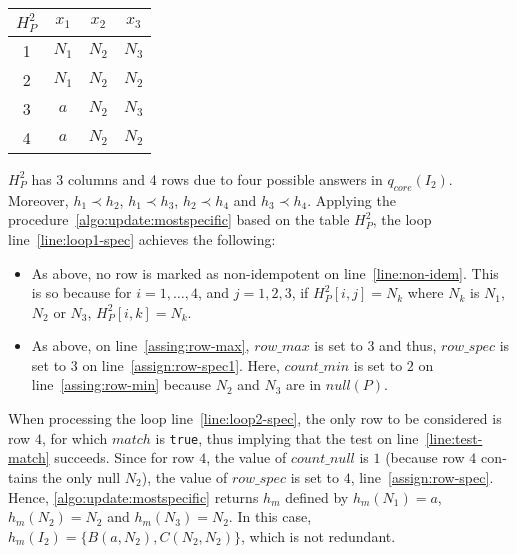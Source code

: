\begin{otherlanguage}{english}
\begin{example}
    \begin{center}
        \begin{tabular}{c|ccc}
            $H_P^2$ & $x_1$  & $x_2$ & $x_3$ \\ \hline
            1       & $N_1 $ & $N_2$ & $N_3$ \\
            2       & $N_1$  & $N_2$ & $N_2$ \\
            3       & $a$    & $N_2$ & $N_3$ \\
            4       & $a$    & $N_2$ & $N_2$ \\
        \end{tabular}
    \end{center}
    $H_P^2$ has 3 columns and 4 rows due to four possible answers in $q_{core}(I_2)$.
    Moreover,
    $h_1 \prec h_2$, $h_1 \prec h_3$, $h_2 \prec h_4$ and $h_3 \prec h_4$.
    Applying the procedure~\ref{algo:update:mostspecific} based on the table $H_P^2$, the loop line~\ref{line:loop1-spec} achieves the following:
    \begin{itemize}
        \item
              As above, no row is marked as non-idempotent on line~\ref{line:non-idem}.
              This is so because for $i=1, \ldots, 4$, and $j=1,2,3$, if $H^2_P[i,j]=N_k$ where $N_k$ is $N_1$, $N_2$ or $N_3$, $H^2_P[i,k]=N_k$.
        \item
              As above, on line~\ref{assing:row-max}, $row\_max$ is set to $3$ and thus, $row\_spec$ is set to $3$ on line~\ref{assign:row-spec1}.
              Here, $count\_min$ is set to $2$ on line~\ref{assing:row-min} because $N_2$ and $N_3$ are in $null(P)$.
    \end{itemize}
    When processing the loop line~\ref{line:loop2-spec}, the only row to be considered is row $4$, for which $match$ is {\tt true}, thus implying that the test on line~\ref{line:test-match} succeeds.
    Since for row $4$, the value of $count\_null$ is $1$ (because row $4$ contains the only null $N_2$), the value of $row\_spec$ is set to $4$, line~\ref{assign:row-spec}.
    Hence, \ref{algo:update:mostspecific} returns $h_m$ defined by $h_m(N_1)=a$, $h_m(N_2)=N_2$ and $h_m(N_3)=N_2$.
    In this case,  $h_m(I_2)=\{B(a, N_2), C(N_2,N_2)\}$, which is not redundant.
\end{example}



\end{otherlanguage}
